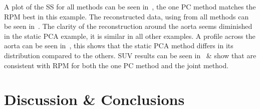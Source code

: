     A plot of the \gls{SS} for all methods can be seen in~, the one \gls{PC} method matches the \gls{RPM} best in this example. The reconstructed data, using  from all methods can be seen in~. The clarity of the reconstruction around the aorta seems diminished in the static \gls{PCA} example, it is similar in all other examples. A profile across the aorta can be seen in~, this shows that the static \gls{PCA} method differs in its distribution compared to the others. \gls{SUV} results can be seen in~ \& show that  are consistent with \gls{RPM} for both the one \gls{PC} method and the joint method.
    
\section{Discussion \& Conclusions} \label{sec:discussion_and_conclusions}
    
